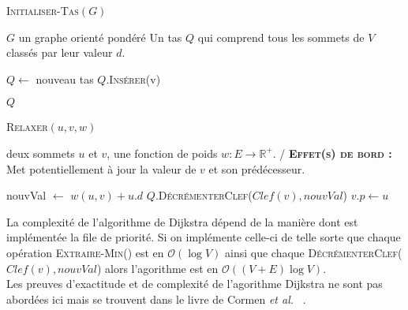 
\begin{algorithm}
	\caption{\textsc {Initialiser-Tas}$(G)$}
	 \label{algo:initTas}
	\begin{algorithmic}[1]
		\REQUIRE $G$ un graphe orienté pondéré
		\ENSURE Un tas $Q$ qui comprend tous les sommets de $V$ classés par leur valeur $d$.
		
		\STATE $Q \leftarrow$ nouveau tas 
			\STATE $Q.$\textsc{Insérer}(v)
		\ENDFOR
		
		\RETURN $Q$
	
			
\end{algorithmic}
		
\end{algorithm}


\begin{algorithm}
	\caption{\textsc {Relaxer}$(u,v,w)$}
	 \label{algo:relaxer}
	\begin{algorithmic}[1]
		\REQUIRE deux sommets $u$ et $v$, une fonction de poids $w : E \rightarrow \mathbb{R}^{+}$.
		\ENSURE / \textbf{\textsc{Effet(s) de bord :}} Met potentiellement à jour la  valeur de $v$ et son prédécesseur.
		
		\STATE nouvVal $\leftarrow$ $w(u,v) + u.d$
			\STATE $Q.$\textsc{DécrémenterClef}($Clef(v),nouvVal$)
			\STATE $v.p \leftarrow u$
		\ENDIF
	
			
\end{algorithmic}
		
\end{algorithm}

La complexité de l'algorithme de Dijkstra dépend de la manière dont est implémentée la file de priorité. Si on implémente celle-ci de telle sorte que chaque opération \textsc{Extraire-Min}() est en $\mathcal{O}(\log V)$ ainsi que chaque \textsc{DécrémenterClef}($Clef(v),nouvVal$) alors l'agorithme est en \mbox{$\mathcal{O}((V + E) \log V)$}.\\
Les preuves d'exactitude et de complexité de l'agorithme Dijkstra ne sont pas abordées ici mais se trouvent dans le livre de Cormen \emph{et al.} ~\cite{Cormen:2009:IA:580470}.


\clearpage

